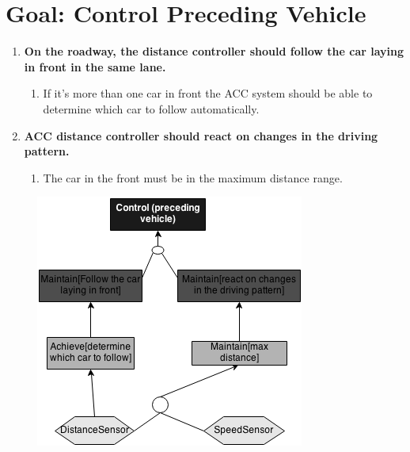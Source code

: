 \section{Goal: Control Preceding Vehicle}
	
	\begin{enumerate}
		\item {\bf On the roadway, the distance controller should follow the car laying in 
		front in the same lane.}
			\begin{enumerate}[label*=\arabic*.]
				\item If it’s more than one car in front the ACC system should be able 
				to determine which car to follow automatically.
			\end{enumerate}
		\item {\bf ACC distance controller should react on changes in the driving pattern.}
			\begin{enumerate}[label*=\arabic*.]
				\item The car in the front must be in the maximum distance range. 
			\end{enumerate}
	\end{enumerate}	

	\begin{figure}[H]
		\includegraphics[width=\textwidth]{pics/ControlPrecedingVehicle.png}
	\end{figure}
	